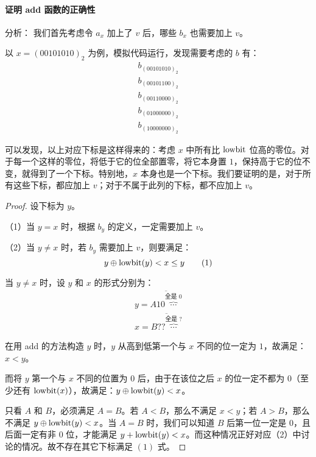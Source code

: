 \documentclass[UTF8]{article}
\newcommand \code[1] {\colorbox[RGB]{245,245,245}{\Consolas #1}}
\begin{document}
	\paragraph{证明 \code{add} 函数的正确性}

	分析：
	我们首先考虑令 $a_x$ 加上了 $v$ 后，哪些 $b_x$ 也需要加上 $v$。

	以 $x = (00101010)_2$ 为例，模拟代码运行，发现需要考虑的 $b$ 有：
	\begin{align*}
		b_{(00101010)_2}
		\\
		b_{(00101100)_2}
		\\
		b_{(00110000)_2}
		\\
		b_{(01000000)_2}
		\\
		b_{(10000000)_2}
	\end{align*}

	可以发现，以上对应下标是这样得来的：考虑 $x$ 中所有比 $\mathrm{lowbit}$ 位高的零位。对于每一个这样的零位，将低于它的位全部置零，将它本身置 $1$，保持高于它的位不变，就得到了一个下标。特别地，$x$ 本身也是一个下标。我们要证明的是，对于所有这些下标，都应加上 $v$；对于不属于此列的下标，都不应加上 $v$。

	\begin{proof}

		设下标为 $y$。

		（1）当 $y = x$ 时，根据 $b_y$ 的定义，一定需要加上 $v$。

		（2）当 $y \ne x$ 时，若 $b_y$ 需要加上 $v$，则要满足：
		\begin{equation*}
			y \oplus \mathrm{lowbit}(y) < x \le y \tag{1}
		\end{equation*}

		当 $y \ne x$ 时，设 $y$ 和 $x$ 的形式分别为：
		\begin{align*}
			y = \overline{A10 \overbrace{\cdots}^{\text{全是 0}}}
			\\
			x = \overline{B?? \overbrace{\cdots}^{\text{全是 ?}}}
		\end{align*}


		在用 \code{add} 的方法构造 $y$ 时，$y$ 从高到低第一个与 $x$ 不同的位一定为 $1$，故满足：$x < y$。

		而将 $y$ 第一个与 $x$ 不同的位置为 $0$ 后，由于在该位之后 $x$ 的位一定不都为 $0$（至少还有 $\mathrm{lowbit}(x)$），故满足：$y \oplus \mathrm{lowbit}(y) < x$。

		\bigskip


		只看 $A$ 和 $B$，必须满足 $A = B$。若 $A < B$，那么不满足 $x < y$；若 $A > B$，那么不满足 $y \oplus \mathrm{lowbit}(y) < x$。当 $A = B$ 时，我们可以知道 $B$ 后第一位一定是 $0$，且后面一定有非 $0$ 位，才能满足 $y + \mathrm{lowbit}(y) < x$。而这种情况正好对应（2）中讨论的情况。故不存在其它下标满足 $(1)$ 式。

	\end{proof}
\end{document}
